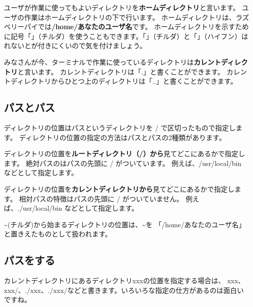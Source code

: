 
ユーザが作業に使ってもよいディレクトリを{\bf ホームディレクトリ}と言います。
ユーザの作業はホームディレクトリの下で行います。
ホームディレクトリは、ラズベリーパイでは{\bf /home/あなたのユーザ名}です。
ホームディレクトリを示すために記号「\code{\textasciitilde}」（チルダ）を使うこともできます。「\code{\textasciitilde}」（チルダ）と「\code{-}」（ハイフン）はれないとが付きにくいので気を付けましょう。


みなさんが今、ターミナルで作業に使っているディレクトリは{\bf カレントディレクトリ}と言います。
カレントディレクトリは「.」と書くことができます。
カレントディレクトリからひとつ上のディレクトリは「..」と書くことができます。

\subsection{パスとパス}
ディレクトリの位置はパスというディレクトリを / で区切ったもので指定します。
ディレクトリの位置の指定の方法はパスとパスの2種類があります。


ディレクトリの位置を{\bf ルートディレクトリ（/）から}見てどこにあるかで指定します。
絶対パスのはパスの先頭に / がついています。
例えば、/usr/local/bin などとして指定します。


ディレクトリの位置を{\bf カレントディレクトリから}見てどこにあるかで指定します。
相対パスの特徴はパスの先頭に / がついていません。
例えば、./usr/local/bin などとして指定します。


\textasciitilde (チルダ)から始まるディレクトリの位置は、\textasciitilde を
「/home/あなたのユーザ名」と置きえたものとして扱われます。

\subsection{パスをする}
カレントディレクトリにあるディレクトリxxxの位置を指定する場合は、
xxx、xxx/、./xxx、./xxx/などと書きます。いろいろな指定の仕方があるのは面白いですね。

